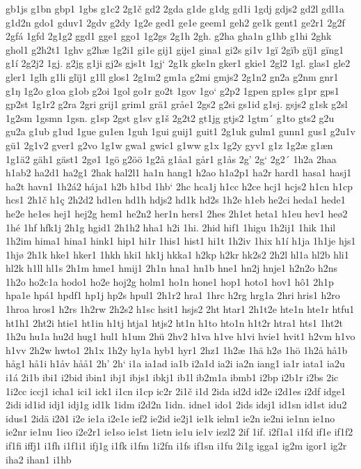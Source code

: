 gb1js
g1bn
gbp1
1gbs
g1c2
2g1č
gd2
2gda
g1de
g1dg
gd1i
1gdj
gdjs2
gd2l
gdl1a
g1d2n
gdo1
gduv1
2gdv
g2dy
1g2e
ged1
ge1e
geem1
geh2
ge1k
gent1
ge2r1
2g2f
2gfá
1gfd
2g1g2
ggd1
gge1
ggo1
1g2gs
2g1h
2gh.
g2ha
gha1n
g1hb
g1hi
2ghk
ghol1
g2h2t1
1ghv
g2hæ
1g2i1
gi1e
gij1
gije1
gina1
gi2s
gi1v
1gï
2gïb
gïj1
gïng1
g1í
2g2j2
1gj.
g2jg
g1ji
gj2s
gjs1t
1gj`
2g1k
gke1n
gker1
gkie1
2gl2
1gl.
glas1
gle2
gler1
1glh
g1li
glïj1
g1ll
glos1
2g1m2
gm1a
g2mi
gmjs2
2g1n2
gn2a
g2nm
gnr1
g1ŋ
1g2o
g1oa
g1ob
g2oi
1gol
go1r
go2t
1gov
1go`
g2p2
1gpen
gp1es
g1pr
gps1
gp2st
1g1r2
g2ra
2gri
grij1
grim1
grä1
gråe1
2gs2
g2si
gs1id
g1sj.
gsjs2
g1sk
g2sl
1g2sm
1gsmn
1gsn.
g1sp
2gst
g1sv
g1š
2g2t2
gt1jg
gtjs2
1gtm´
g1to
gts2
g2u
gu2a
g1ub
g1ud
1gue
gu1en
1guh
1gui
guij1
guit1
2g1uk
gulm1
gunn1
gus1
g2u1v
gü1
2g1v2
gver1
g2vo
1g1w
gwa1
gwic1
g1ww
g1x
1g2y
gyv1
g1z
1g2æ
g1æn
1g1ä2
gäh1
gäst1
2gø1
1gö
g2öö
1g2å
g1åa1
går1
g1ås
2g'
2g`
2g2´
1h2a
2haa
h1ab2
ha2d1
ha2g1
2hak
hal2l1
ha1n
hang1
h2ao
h1a2p1
ha2r
hard1
hasa1
hasj1
ha2t
havn1
1h2á2
hája1
h2b
h1bd
1hb`
2hc
hca1j
h1cc
h2ce
hcj1
hcjs2
h1cn
h1cp
hcs1
2h1č
h1ç
2h2d2
hd1en
hd1h
hdjs2
hd1k
hd2s
1h2e
h1eb
he2ci
heda1
hede1
he2e
he1es
hej1
hej2g
hem1
he2n2
her1n
hers1
2hes
2h1et
heta1
h1eu
hev1
heø2
1hé
1hf
hfk1j
2h1g
hgid1
2h1h2
hha1
h2i
1hi.
2hid
hif1
1higu
1h2ij1
1hik
1hil
1h2im
hima1
hina1
hink1
hip1
hi1r
1his1
hist1
hi1t
1h2iv
1hix
h1í
h1ja
1h1je
hjs1
1hjø
2h1k
hke1
hker1
1hkh
hki1
hk1j
hkka1
h2kp
h2kr
hk2s2
2h2l
hl1a
hl2b
hli1
hl2k
h1ll
hl1s
2h1m
hme1
hmij1
2h1n
hna1
hn1b
hne1
hn2j
hnje1
h2n2o
h2ns
1h2o
ho2c1a
hodo1
ho2e
hoj2g
holm1
ho1n
hone1
hop1
hoto1
hov1
hô1
2h1p
hpa1e
hpá1
hpdf1
hp1j
hp2s
hpul1
2h1r2
hra1
1hrc
h2rg
hrg1a
2hri
hris1
h2ro
1hroa
hros1
h2rs
1h2rw
2h2s2
h1sc
hsit1
hsjs2
2ht
htar1
2h1t2e
hte1n
hte1r
htfu1
ht1h1
2ht2i
htie1
ht1in
h1tj
htja1
htjs2
ht1n
h1to
hto1n
h1t2r
htra1
hts1
1ht2t
1h2u
hu1a
hu2d
hug1
hul1
h1um
2hü
2hv2
h1va
h1ve
h1vi
hvie1
hvit1
h2vm
h1vo
h1vv
2h2w
hwto1
2h1x
1h2y
hy1a
hyb1
hyr1
2hz1
1h2æ
1hä
h2ø
1hö
1h2å
hå1b
håg1
hå1i
h1åv
håå1
2h'
2h`
i1a
ia1ad
ia1b
i2a1d
ia2i
ia2n
iang1
ia1r
iata1
ia2u
i1á
2i1b
ibi1
i2bid
ibin1
ibj1
ibjs1
ibkj1
ib1l
ib2m1a
ibmb1
i2bp
i2b1r
i2bs
2ic
1i2cc
iccj1
icha1
ici1
ick1
i1cn
i1cp
ic2r
2i1č
i1d
2ida
id2d
id2e
i2d1es
i2df
idge1
2idi
id1id
idj1
idj1g
id1k
1idm
i2d2n
1idn.
idne1
ido1
2ids
idsj1
id1sn
id1st
idu2
idus1
2idä
i2ð1
i2e
ie1a
i2e1e
ief2
ie2id
ie2j1
ie1k
ielm1
ie2n
ie2ni
ie1nn
ie1no
ie2nr
ie1nu
1ieo
i2e2r1
ie1so
ie1st
1ietn
ie1u
ie1v
iezl2
2if
1if.
i2f1a1
i1fd
if1e
if1f2
if1fi
iffj1
i1fh
i1f1i1
ifj1g
i1fk
i1fm
1i2fn
i1fs
if1sn
i1fu
2i1g
igga1
ig2m
igor1
ig2r
iha2
ihan1
i1hb
